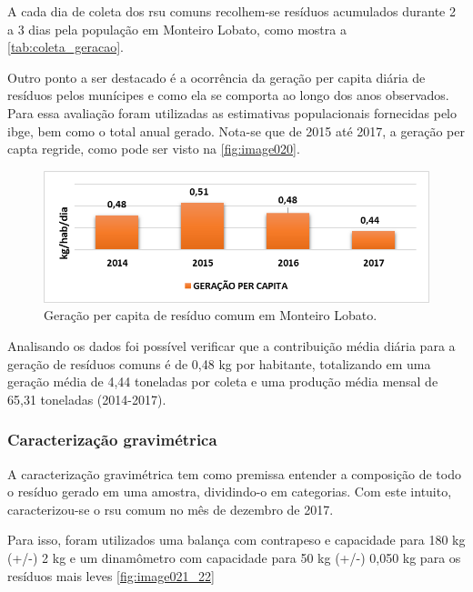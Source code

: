 A cada dia de coleta dos \gls{rsu} comuns recolhem-se resíduos acumulados durante 2 a 3 dias pela população em Monteiro Lobato, como mostra a \autoref{tab:coleta_geracao}.



Outro ponto a ser destacado é a ocorrência da geração per capita diária de resíduos pelos munícipes e como ela se comporta ao longo dos anos observados. Para essa avaliação foram utilizadas as estimativas populacionais fornecidas pelo \gls{ibge}, bem como o total anual gerado. Nota-se que de 2015 até 2017, a geração per capta regride, como pode ser visto na \autoref{fig:image020}.

\begin{figure}
	\centering
	\includegraphics[width=0.7\linewidth]{produtos/prodtres/image020}
	\caption{Geração per capita de resíduo comum em Monteiro Lobato.}
	\label{fig:image020}
\end{figure}


Analisando os dados foi possível verificar que a contribuição média diária para a geração de resíduos comuns é de 0,48 kg por habitante, totalizando em uma geração média de 4,44 toneladas por coleta e uma produção média mensal de 65,31 toneladas (2014-2017).

\subsubsection{Caracterização gravimétrica} 	
\label{subsubsec:gravimetria_comum}

A caracterização gravimétrica tem como premissa entender a composição de todo o resíduo gerado em uma amostra, dividindo-o em categorias. Com este intuito, caracterizou-se o \gls{rsu} comum no mês de dezembro de 2017.

Para isso, foram utilizados uma balança com contrapeso e capacidade para 180 kg (+/-) 2 kg e um dinamômetro com capacidade para 50 kg (+/-) 0,050 kg para os resíduos mais leves \autoref{fig:image021_22}


